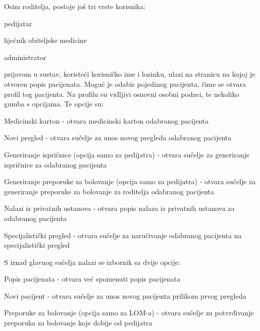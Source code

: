 		\noindent Osim roditelja, postoje još tri vrste korisnika:
		
		\begin{packed_item}
			
			\item  pedijatar
			\item  liječnik obiteljske medicine
			\item  administrator
			
		\end{packed_item}	
		
		 prijavom u sustav, koristeći korisničko ime i lozinku, ulazi na stranicu na kojoj je otvoren popis pacijenata. Moguć je odabir pojedinog pacijenta, čime se otvara profil tog pacijenta. Na profilu su vidljivi osnovni osobni podaci, te nekoliko gumba s opcijama. Te opcije su:
		
		\begin{packed_item}
			
			\item  Medicinski karton - otvara medicinski karton odabranog pacijenta
			\item  Novi pregled - otvara sučelje za unos novog pregleda odabranog pacijenta
			\item  Generiranje ispričnice (opcija samo za pedijatra) - otvara sučelje za generiranje ispričnice za odabranog pacijenta
			\item  Generiranje preporuke za bolovanje  (opcija samo za pedijatra) - otvara sučelje za generiranje preporuke za bolovanje za roditelja odabranog pacijenta
			\item  Nalazi iz privatnih ustanova - otvara popis nalaza iz privatnih ustanova za odabranog pacijenta
			\item  Specijalistički pregled - otvara sučelje za naručivanje odabranog pacijenta na specijalistički pregled
			
		\end{packed_item}
		
		S iznad glavnog sučelja nalazi se izbornik sa dvije opcije:
		
		\begin{packed_item}
			
			\item  Popis pacijenata - otvara već spomenuti popis pacijenata
			\item  Novi pacijent - otvara sučelje za unos novog pacijenta prilikom prvog pregleda
			\item  Preporuke za bolovanje (opcija samo za LOM-a) - otvara sučelje za potvrđivanje preporuka za bolovanje koje dobije od pedijatra
			
		\end{packed_item}	
		
